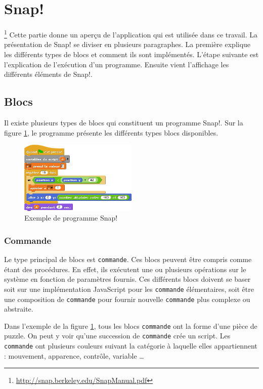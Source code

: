\section{Snap!}
\footnote{\url{http://snap.berkeley.edu/SnapManual.pdf}}  %
Cette partie donne un aperçu de l'application qui est utilisée dans ce travail. La présentation de Snap! se diviser en plusieurs paragraphes. La première explique les différents types de blocs et comment ils sont implémentés. L'étape suivante est l'explication de l'exécution d'un programme. Ensuite vient l'affichage les différents éléments de Snap!. %

\subsection{Blocs}
Il existe plusieurs types de blocs qui constituent un programme Snap!. Sur la figure \ref{fig:software-used-script}, le programme présente les différents types blocs disponibles.
\begin{figure}
  \begin{center}
    \includegraphics[width=0.5\textwidth]{content/5-related_work/images/script}
    \caption{Exemple de programme Snap!}
    \label{fig:software-used-script}
  \end{center}
\end{figure}

\subsubsection{Commande}
Le type principal de blocs est \texttt{commande}. Ces blocs peuvent être compris comme étant des procédures. En effet, ils exécutent une ou plusieurs opérations sur le système en fonction de paramètres fournis. Ces différents blocs doivent se baser soit sur une implémentation JavaScript pour les \texttt{commande} élémentaires, soit être une composition de \texttt{commande} pour fournir nouvelle \texttt{commande} plus complexe ou abstraite.

Dans l'exemple de la figure \ref{fig:software-used-script}, tous les blocs \texttt{commande} ont la forme d'une pièce de puzzle. On peut y voir qu'une succession de \texttt{commande} crée un script. Les \texttt{commande} ont plusieurs couleurs suivant la catégorie à laquelle elles appartiennent : mouvement, apparence, contrôle, variable \ldots

